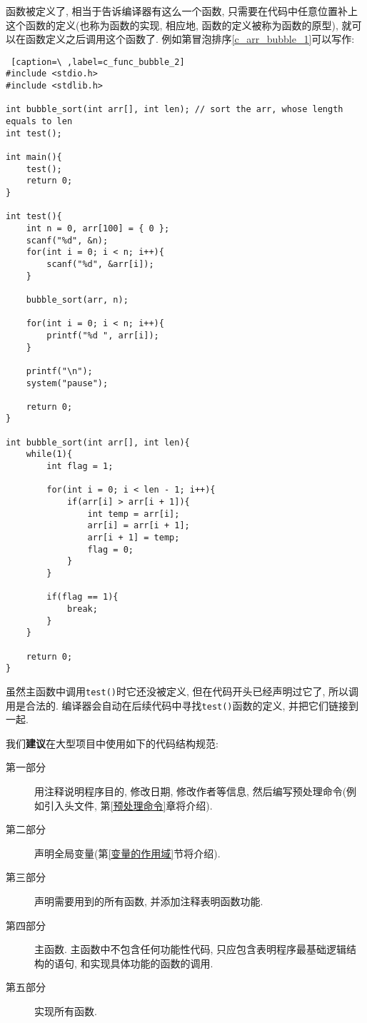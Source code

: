         函数被定义了, 相当于告诉编译器有这么一个函数, 只需要在代码中任意位置补上这个函数的定义(也称为函数的实现, 相应地, 函数的定义被称为函数的原型), 就可以在函数定义之后调用这个函数了. 例如第冒泡排序\ref{c_arr_bubble_1}可以写作:
\begin{lstlisting} [caption=\ ,label=c_func_bubble_2]
#include <stdio.h>
#include <stdlib.h>

int bubble_sort(int arr[], int len); // sort the arr, whose length equals to len
int test();

int main(){
    test();
    return 0;
}

int test(){
    int n = 0, arr[100] = { 0 };
    scanf("%d", &n);
    for(int i = 0; i < n; i++){
        scanf("%d", &arr[i]);
    }

    bubble_sort(arr, n);

    for(int i = 0; i < n; i++){
        printf("%d ", arr[i]);
    }

    printf("\n");
    system("pause");

    return 0;
}

int bubble_sort(int arr[], int len){
    while(1){
        int flag = 1;

        for(int i = 0; i < len - 1; i++){
            if(arr[i] > arr[i + 1]){
                int temp = arr[i];
                arr[i] = arr[i + 1];
                arr[i + 1] = temp;
                flag = 0;
            }
        }

        if(flag == 1){
            break;
        }
    }

    return 0;
}
\end{lstlisting}

        虽然主函数中调用\texttt{test()}时它还没被定义, 但在代码开头已经声明过它了, 所以调用是合法的. 编译器会自动在后续代码中寻找\texttt{test()}函数的定义, 并把它们链接到一起.

        我们\textbf{建议}在大型项目中使用如下的代码结构规范:
        \begin{description}
            \item[第一部分] 用注释说明程序目的, 修改日期, 修改作者等信息, 然后编写预处理命令(例如引入头文件, 第\ref{预处理命令}章将介绍).
            \item[第二部分] 声明全局变量(第\ref{变量的作用域}节将介绍).
            \item[第三部分] 声明需要用到的所有函数, 并添加注释表明函数功能.
            \item[第四部分] 主函数. 主函数中不包含任何功能性代码, 只应包含表明程序最基础逻辑结构的语句, 和实现具体功能的函数的调用. 
            \item[第五部分] 实现所有函数. 
        \end{description}

